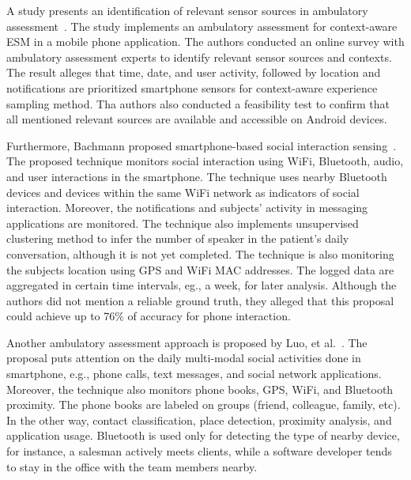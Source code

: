 A study presents an identification of relevant sensor sources in ambulatory assessment~\cite{thesis001}. The study implements an ambulatory assessment for context-aware \ac{ESM} in a mobile phone application. The authors conducted an online survey with ambulatory assessment experts to identify relevant sensor sources and contexts. The result alleges that time, date, and user activity, followed by location and notifications are prioritized smartphone sensors for context-aware experience sampling method. Tha authors also conducted a feasibility test to confirm that all mentioned relevant sources are available and accessible on Android devices.

Furthermore, Bachmann proposed smartphone-based social interaction sensing~\cite{thesis031}. The proposed technique monitors social interaction using WiFi, Bluetooth, audio, and user interactions in the smartphone. The technique uses nearby Bluetooth devices and devices within the same WiFi network as indicators of social interaction. Moreover, the notifications and subjects' activity in messaging applications are monitored.
The technique also implements unsupervised clustering method to infer the number of speaker in the patient's daily conversation, although it is not yet completed.
The technique is also monitoring the subjects location using \ac{GPS} and WiFi \ac{MAC} addresses. The logged data are aggregated in certain time intervals, eg., a week, for later analysis. Although the authors did not mention a reliable ground truth, they alleged that this proposal could achieve up to 76\% of accuracy for phone interaction.

Another ambulatory assessment approach is proposed by Luo, et al.~\cite{thesis030}. The proposal puts attention on the daily multi-modal social activities done in smartphone, e.g., phone calls, text messages, and social network applications. Moreover, the technique also monitors phone books, GPS, WiFi, and Bluetooth proximity. The phone books are labeled on groups (friend, colleague, family, etc). In the other way, contact classification, place detection, proximity analysis, and application usage. Bluetooth is used only for detecting the type of nearby device, for instance, a salesman actively meets clients, while a software developer tends to stay in the office with the team members nearby.














